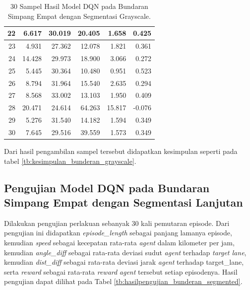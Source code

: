 \begin{table}[H]
{\begin{tabular}{|r|r|r|r|r|r|}
			22 & 6.617  & 30.019 & 20.405 & 1.658  & 0.425  \\ \hline
			23 & 4.931  & 27.362 & 12.078 & 1.821  & 0.361  \\ \hline
			24 & 14.428 & 29.973 & 18.900 & 3.066  & 0.272  \\ \hline
			25 & 5.445  & 30.364 & 10.480 & 0.951  & 0.523  \\ \hline
			26 & 8.794  & 31.964 & 15.540 & 2.635  & 0.294  \\ \hline
			27 & 8.568  & 33.002 & 13.103 & 1.950  & 0.409  \\ \hline
			28 & 20.471 & 24.614 & 64.263 & 15.817 & -0.076 \\ \hline
			29 & 5.276  & 31.540 & 14.182 & 1.594  & 0.349  \\ \hline
			30 & 7.645  & 29.516 & 39.559 & 1.573  & 0.349  \\ \hline
		\end{tabular}%
	}
	\caption{30 Sampel Hasil Model DQN pada Bundaran Simpang Empat dengan Segmentasi Grayscale.}
	\label{tb:hasilpengujian_bunderan_grayscale}
\end{table}


Dari hasil pengambilan sampel tersebut didapatkan kesimpulan seperti pada tabel \ref{tb:kesimpulan_bunderan_grayscale}.

\begin{table}[H]
	\caption{Kesimpulan Hasil Model DQN pada Bundaran Simpang Empat dengan Segmentasi Grayscale.}
	\label{tb:kesimpulan_bunderan_grayscale}
\end{table}



\subsection{Pengujian Model DQN pada Bundaran Simpang Empat dengan Segmentasi Lanjutan}
\label{sec:pengujian_dqn_bundaran_simpangempat_segmentasi_hitam_putih}

Dilakukan pengujian perlakuan sebanyak 30 kali pemutaran episode. Dari pengujian ini didapatkan \textit{episode\_length }sebagai panjang lamanya episode, kemudian \textit{speed} sebagai kecepatan rata-rata \textit{agent} dalam kilometer per jam, kemudian \textit{angle\_diff} sebagai rata-rata deviasi sudut \textit{agent} terhadap \textit{target lane}, kemudian \textit{dist\_diff} sebagai rata-rata deviasi jarak \textit{agent} terhadap target\_lane, serta \textit{reward} sebagai rata-rata \textit{reward }\textit{agent} tersebut setiap episodenya. Hasil pengujian dapat dilihat pada Tabel \ref{tb:hasilpengujian_bunderan_segmented}.

